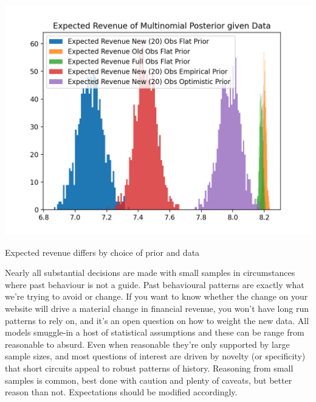 \documentclass{tufte-handout}
\begin{document}
\begin{marginfigure}
  \includegraphics[width=\linewidth]{../Expectation/Plots/expected_revenue_distributions.png}
  \caption{Expected revenue differs by choice of prior and data}
\end{marginfigure}

\noindent Nearly all substantial decisions are made with small samples in circumstances where past behaviour is not a guide. Past behavioural patterns are exactly what we're trying to avoid or change. If you want to know whether the change on your website will drive a material change in financial revenue, you won't have long run patterns to rely on, and it's an open question on how to weight the new data. All models smuggle-in a host of statistical assumptions and these can be range from reasonable to absurd. Even when reasonable they're only supported by large sample sizes, and most questions of interest are driven by novelty (or specificity) that short circuits appeal to robust patterns of history. Reasoning from small samples is common, best done with caution and plenty of caveats, but better reason than not. Expectations should be modified accordingly.
\end{document}
